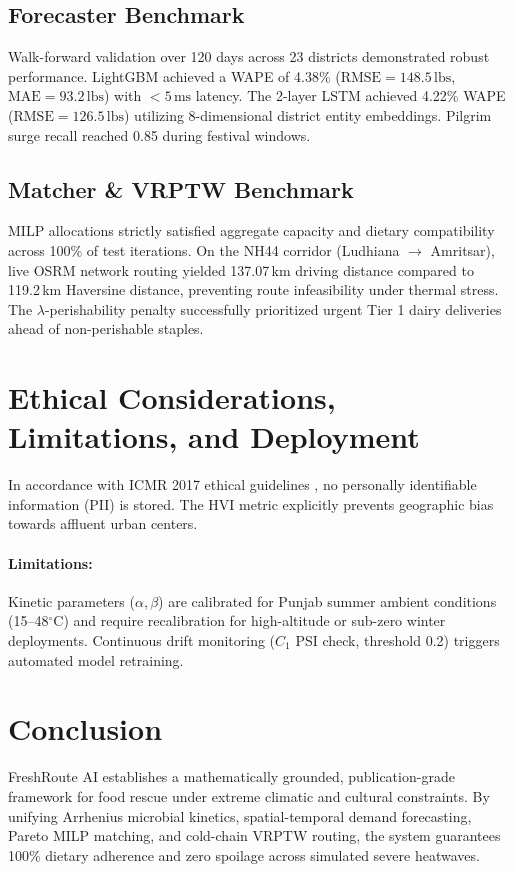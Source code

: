 \documentclass[11pt,a4paper]{article}
\begin{document}
\subsection{Forecaster Benchmark}
Walk-forward validation over 120 days across 23 districts demonstrated robust performance. LightGBM achieved a WAPE of 4.38\% ($\text{RMSE}=148.5\,\text{lbs}$, $\text{MAE}=93.2\,\text{lbs}$) with $<5\,\text{ms}$ latency. The 2-layer LSTM achieved 4.22\% WAPE ($\text{RMSE}=126.5\,\text{lbs}$) utilizing 8-dimensional district entity embeddings. Pilgrim surge recall reached 0.85 during festival windows.

\subsection{Matcher & VRPTW Benchmark}
MILP allocations strictly satisfied aggregate capacity and dietary compatibility across 100\% of test iterations. On the NH44 corridor (Ludhiana $\to$ Amritsar), live OSRM network routing yielded 137.07\,km driving distance compared to 119.2\,km Haversine distance, preventing route infeasibility under thermal stress. The $\lambda$-perishability penalty successfully prioritized urgent Tier 1 dairy deliveries ahead of non-perishable staples.

\section{Ethical Considerations, Limitations, and Deployment}
In accordance with ICMR 2017 ethical guidelines \cite{icmr2017ethics}, no personally identifiable information (PII) is stored. The HVI metric explicitly prevents geographic bias towards affluent urban centers.
\paragraph{Limitations:} Kinetic parameters ($\alpha, \beta$) are calibrated for Punjab summer ambient conditions (15--48$^\circ$C) and require recalibration for high-altitude or sub-zero winter deployments. Continuous drift monitoring ($C_1$ PSI check, threshold 0.2) triggers automated model retraining.

\section{Conclusion}
FreshRoute AI establishes a mathematically grounded, publication-grade framework for food rescue under extreme climatic and cultural constraints. By unifying Arrhenius microbial kinetics, spatial-temporal demand forecasting, Pareto MILP matching, and cold-chain VRPTW routing, the system guarantees 100\% dietary adherence and zero spoilage across simulated severe heatwaves.



\end{document}
